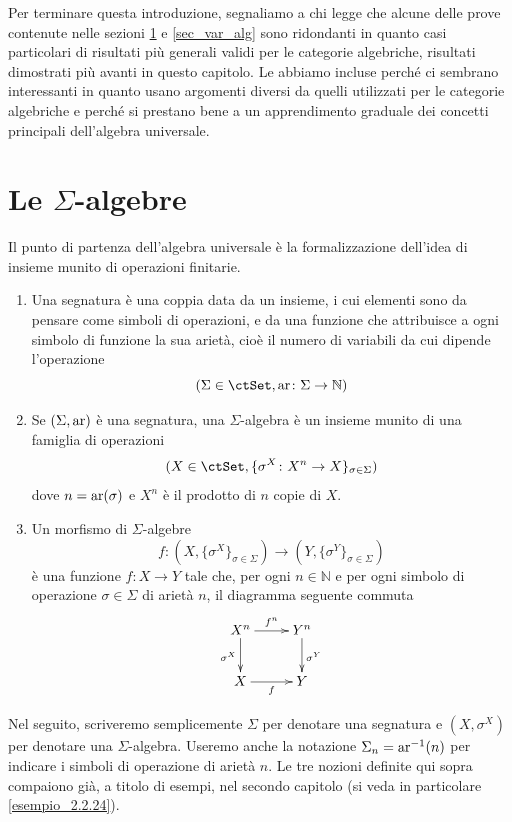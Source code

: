Per terminare questa introduzione, segnaliamo a chi legge che alcune delle prove contenute nelle sezioni \ref{sec_sigma-alg}
e \ref{sec_var_alg} sono ridondanti in quanto casi particolari di risultati più generali validi per le categorie algebriche, risultati
dimostrati più avanti in questo capitolo. Le abbiamo incluse perché ci sembrano interessanti in quanto usano argomenti
diversi da quelli utilizzati per le categorie algebriche e perché si prestano bene a un apprendimento graduale dei concetti
principali dell'algebra universale.

\section{Le \(\Sigma\)-algebre}\label{sec_sigma-alg}

Il punto di partenza dell'algebra universale è la formalizzazione dell'idea di insieme munito di operazioni finitarie.

\begin{definition}\label{def_sigma_alg}
 \hfill
 \begin{enumerate}
  \item Una segnatura è una coppia data da un insieme, i cui elementi sono da pensare come simboli di operazioni, e da una funzione che
        attribuisce a ogni simbolo di funzione la sua arietà, cioè il numero di variabili da cui dipende l'operazione
        \[(\Sigma \in \ctSet, \arity \colon \Sigma \to \mathbb N)\]
  \item Se \((\Sigma, \text{ar})\) è una segnatura, una \(\Sigma\)-algebra è un insieme munito di una famiglia di operazioni
        \[(X \in \ctSet, \{\sigma^X \colon X^{n} \to X\}_{\sigma \in \Sigma})\]
        dove \(n = \text{ar}(\sigma)\) e \(X^n\) è il prodotto di \(n\) copie di \(X\).
  \item Un morfismo di \(\Sigma\)-algebre
        \[f \colon (X,\{\sigma^X\}_{\sigma \in \Sigma}) \to (Y,\{\sigma^Y\}_{\sigma \in \Sigma})\]
        è una funzione \(f \colon X \to Y\) tale che, per ogni \(n \in \mathbb N\) e per ogni simbolo di operazione \(\sigma \in \Sigma\) di arietà \(n\),
        il diagramma seguente commuta
        \[\xymatrix{ X^{n} \ar[r]^-{f^n} \ar[d]_{\sigma^X} & Y^{n} \ar[d]^{\sigma^Y} \\
         X \ar[r]_-{f} & Y}\]
 \end{enumerate}
 Nel seguito, scriveremo semplicemente \(\Sigma\) per denotare una segnatura e \((X,\sigma^X)\) per denotare una \(\Sigma\)-algebra.
 Useremo anche la notazione \(\Sigma_n = \text{ar}^{-1}(n)\) per indicare i simboli di operazione di arietà \(n\).
 Le tre nozioni definite qui sopra compaiono già, a titolo di esempi, nel secondo capitolo (si veda in particolare \ref{esempio_2.2.24}).
\end{definition}

